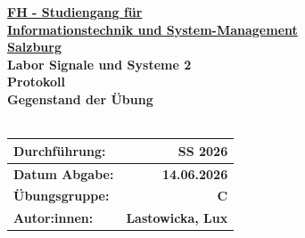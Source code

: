 \documentclass[11pt,a4paper]{article}
\begin{document}
\begin{center}
    {\Large\bfseries \underline{FH - Studiengang für}}\\[0.4em]
    {\Large\bfseries \underline{Informationstechnik und System-Management}}\\[0.4em]
    {\Large\bfseries \underline{Salzburg}}\\[3.5em]
    
    {\Large\bfseries Labor Signale und Systeme 2}\\[3.5em]
    
    {\Huge\bfseries Protokoll}\\[3.5em]
    
    {\Large\bfseries Gegenstand der Übung}\\[1em]
    \setlength{\fboxrule}{1.2pt} %
    \\[5em]
\end{center}

\vspace{\fill}

\noindent
\begin{tabular}{|p{3.5cm}|r|}
    \hline
    \rule[-0.6em]{0pt}{2em}\textbf{Durchführung:} & \textbf{SS 2026} \\ \hline
    \rule[-0.6em]{0pt}{2em}\textbf{Datum Abgabe:} & \textbf{14.06.2026} \\ \hline
    \rule[-0.6em]{0pt}{2em}\textbf{Übungsgruppe:} & \textbf{C} \\ \hline
    \rule[-0.6em]{0pt}{2em}\textbf{Autor:innen:}  & \textbf{Lastowicka, Lux} \\ \hline
\end{tabular}

\vspace{2.5em}

\noindent
{}

\newpage %

\tableofcontents %

\newpage %
\onehalfspacing %
\end{document}
